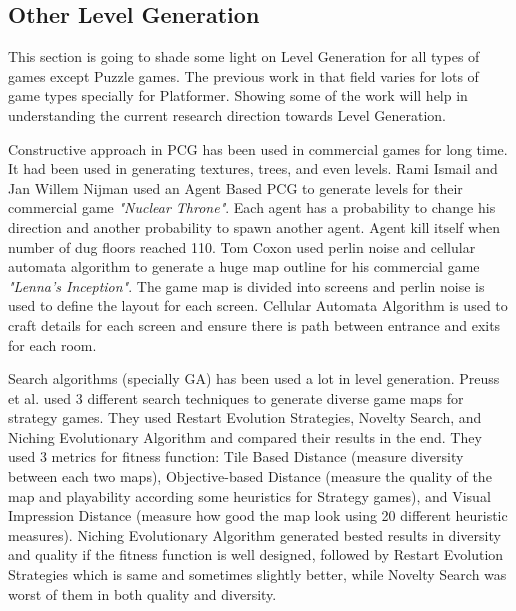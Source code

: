 \subsection{Other Level Generation}
This section is going to shade some light on Level Generation for all types of games except Puzzle games. The previous work in that field varies for lots of game types specially for Platformer. Showing some of the work will help in understanding the current research direction towards Level Generation.\\\par

Constructive approach in PCG has been used in commercial games for long time. It had been used in generating textures, trees, and even levels. Rami Ismail and Jan Willem Nijman\cite{nuclearThrone} used an Agent Based PCG to generate levels for their commercial game \emph{"Nuclear Throne"}. Each agent has a probability to change his direction and another probability to spawn another agent. Agent kill itself when number of dug floors reached 110. Tom Coxon\cite{lennaInception} used perlin noise and cellular automata algorithm to generate a huge map outline for his commercial game \emph{"Lenna's Inception"}. The game map is divided into screens and perlin noise is used to define the layout for each screen. Cellular Automata Algorithm is used to craft details for each screen and ensure there is path between entrance and exits for each room.\\\par

Search algorithms (specially GA) has been used a lot in level generation. Preuss et al.\cite{goodDiverseLevels} used 3 different search techniques to generate diverse game maps for strategy games. They used Restart Evolution Strategies, Novelty Search, and Niching Evolutionary Algorithm and compared their results in the end. They used 3 metrics for fitness function: Tile Based Distance (measure diversity between each two maps), Objective-based Distance (measure the quality of the map and playability according some heuristics for Strategy games), and Visual Impression Distance (measure how good the map look using 20 different heuristic measures). Niching Evolutionary Algorithm generated bested results in diversity and quality if the fitness function is well designed, followed by Restart Evolution Strategies which is same and sometimes slightly better, while Novelty Search was worst of them in both quality and diversity.\\\par

